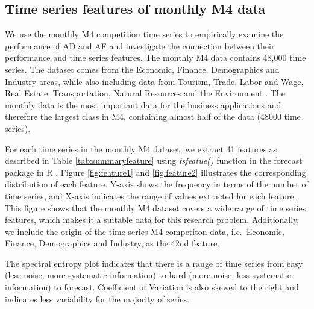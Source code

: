 \documentclass[preprint, 3p,
authoryear]{elsarticle} %
\begin{document}
\hypertarget{mtsmeasure}{%
\subsection{Time series features of monthly M4 data}\label{mtsmeasure}}

We use the monthly M4 competition time series to empirically examine the
performance of AD and AF and investigate the connection between their
performance and time series features. The monthly M4 data contains
48,000 time series. The dataset comes from the Economic, Finance,
Demographics and Industry areas, while also including data from Tourism,
Trade, Labor and Wage, Real Estate, Transportation, Natural Resources
and the Environment \citep{Makridakis2018}. The monthly data is the most
important data for the business applications \citep{Spiliotis2020} and
therefore the largest class in M4, containing almost half of the data
(48000 time series).

For each time series in the monthly M4 dataset, we extract 41 features
as described in Table \ref{tab:summaryfeature} using \emph{tsfeatue()}
function in the forecast package in R \citep{hyndman2008automatic}.
Figure \ref{fig:feature1} and \ref{fig:feature2} illustrates the
corresponding distribution of each feature. Y-axis shows the frequency
in terms of the number of time series, and X-axis indicates the range of
values extracted for each feature. This figure shows that the monthly M4
dataset covers a wide range of time series features, which makes it a
suitable data for this research problem. Additionally, we include the
origin of the time series M4 competiton data, i.e.~Economic, Finance,
Demographics and Industry, as the 42nd feature.

The spectral entropy plot indicates that there is a range of time series
from easy (less noise, more systematic information) to hard (more noise,
less systematic information) to forecast. Coefficient of Variation is
also skewed to the right and indicates less variability for the majority
of series.
\end{document}

